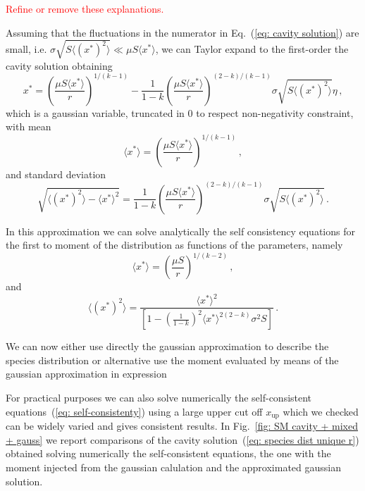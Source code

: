 \documentclass[10pt]{article}
\begin{document}
\textcolor{red}{Refine or remove these explanations.}

Assuming that the fluctuations in the numerator in Eq.~(\ref{eq: cavity solution})
are small, i.e. $\sigma \sqrt{S\langle (x^*)^2\rangle}\ll \mu S \langle x^* \rangle$,
we can Taylor expand to the first-order the cavity solution obtaining
\begin{equation}
    x^* = \left(\frac{ \mu S \langle x^* \rangle}{r}\right)^{1/(k-1)} -
    \frac{1}{1-k}\left(\frac{ \mu S \langle x^* \rangle}{r}\right)^{(2-k)/(k-1)}\sigma \sqrt{S\langle (x^*)^2\rangle}\eta \, ,
\end{equation}
which is a gaussian variable, truncated in 0 to respect
non-negativity constraint, with mean
\begin{equation}
    \langle x^* \rangle = \left(\frac{ \mu S \langle x^* \rangle}{r}\right)^{1/(k-1)} \, ,
\end{equation}
and standard deviation
\begin{equation}
    \sqrt{\langle (x^*)^2 \rangle - \langle x^* \rangle^2} =
    \frac{1}{1-k}\left(\frac{ \mu S \langle x^* \rangle}{r}\right)^{(2-k)/(k-1)}\sigma \sqrt{S\langle (x^*)^2\rangle} \, .
\end{equation}

In this approximation we can solve analytically 
the self consistency equations for the first to moment of the
distribution as functions of the parameters, namely 
\begin{equation}
    \langle x^* \rangle = \left(\frac{ \mu S}{r}\right)^{1/(k-2)} \, ,
\end{equation}
and
\begin{equation}
    \langle (x^*)^2 \rangle = \frac{ \langle x^* \rangle^2}
    {\left[1-\left(\frac{1}{1-k}\right)^2\langle x^* \rangle^{2(2-k)}
    \sigma^2S\right]} \, .
\end{equation}

We can now either use directly the gaussian approximation to describe the
species distribution or alternative use the moment evaluated by means
of the gaussian approximation in expression 

For practical purposes
we can also solve numerically the self-consistent
equations~(\ref{eq: self-consistenty}) using a large
upper cut off $x_{\textrm{up}}$ which we checked can be widely varied
and gives consistent results.
In Fig.~\ref{fig: SM cavity + mixed + gauss} we report comparisons
of the cavity solution~(\ref{eq: species dist unique r}) 
obtained solving numerically the self-consistent equations,
the one with the moment injected from the gaussian calulation and the
approximated gaussian solution.
\end{document}
